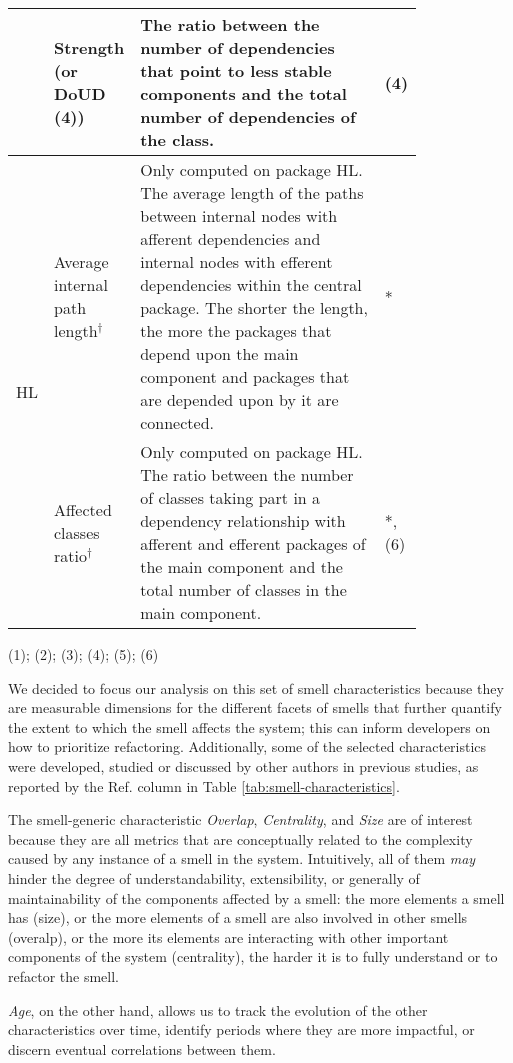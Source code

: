 \begin{table}[]
\begin{tabular}{p{0.035\linewidth}p{0.15\linewidth}p{0.60\linewidth}p{0.025\linewidth}}
     & Strength (or DoUD (4)) & The ratio between the number of dependencies that point to less stable components and the total number of dependencies of the class. & (4) \\ \midrule
     \multirow{3}{0.1\linewidth}{HL} & Average internal path length$^\dagger$ & Only computed on package HL. The average length of the paths between internal nodes with afferent dependencies and internal nodes with efferent dependencies within the central package. The shorter the length, the more the packages that depend upon the main component and packages that are depended upon by it are connected. & * \\
     & Affected classes ratio$^\dagger$ & Only computed on package HL. The ratio between the number of classes taking part in a dependency relationship with afferent and efferent packages of the main component and the total number of classes in the main component. & *, (6) \\\bottomrule
    \end{tabular}
    (1)\cite{Roveda2018}; (2)\cite{Arcelli2016}; (3)\cite{AlMutawa2014}; (4)\cite{Arcelli2017}; (5)\cite{Laval2012}; (6)\cite{Abdeen2011}
\end{table}

We decided to focus our analysis on this set of smell characteristics because they are measurable dimensions for the different facets of smells that further quantify the extent to which the smell affects the system; this can  inform developers on how to prioritize refactoring.
Additionally, some of the selected characteristics were developed, studied or discussed by other authors in previous studies, as reported by the Ref. column in Table \ref{tab:smell-characteristics}.

The smell-generic characteristic \emph{Overlap}, \emph{Centrality}, and \emph{Size} are of interest because they are all metrics that are conceptually related to the complexity caused by any instance of a smell in the system. Intuitively, all of them \emph{may} hinder the degree of understandability, extensibility, or generally of maintainability of the components affected by a smell: the more elements a smell has (size), or the more elements of a smell are also involved in other smells (overalp), or the more its elements are interacting with other important components of the system (centrality), the harder it is to fully understand or to refactor the smell. 

\emph{Age}, on the other hand, allows us to track the evolution of the other characteristics over time, identify periods where they are more impactful, or discern eventual correlations between them.

